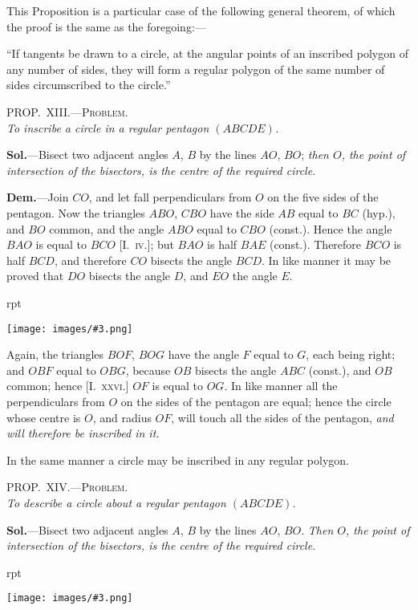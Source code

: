 \documentclass[oneside]{book}
\newcounter{wrapwidth}
\newcommand\myprop[2]{
\bigskip\Needspace*{4\baselineskip}\begin{center}\textsc{#1}\\\medskip\emph{#2}\par\end{center}
}
\newcommand\imgflow[3]{
\setcounter{wrapwidth}{#1}
\begin{wrapfigure}[#2]{r}{\value{wrapwidth}pt}
\begin{center}
\vspace{-0.3in}
\texttt{[image: images/\#3.png]}
\end{center}
\end{wrapfigure}
}
\begin{document}
\begin{footnotesize}
This Proposition is a particular case of the following general
theorem, of which the proof is the same as the foregoing:---

``If tangents be drawn to a circle, at the angular points of an
inscribed polygon of any number of sides, they will form a regular
polygon of the same number of sides circumscribed to the circle.''
\par\end{footnotesize}

\myprop{PROP\@.~XIII\@.---Problem.}{To inscribe a circle in a regular pentagon $(ABCDE)$.}

\textbf{Sol.}---Bisect two adjacent angles $A$, $B$ by the lines
$AO$, $BO$; \textit{then $O$, the point of intersection of the bisectors,
is the centre of the required circle.}

\textbf{Dem.}---Join $CO$, and let fall perpendiculars from $O$
on the five sides of the pentagon.
Now the triangles
$ABO$, $CBO$ have the side $AB$
equal to $BC$ (hyp.), and $BO$
common, and the angle $ABO$
equal to $CBO$ (const.). Hence
the angle $BAO$ is equal to
$BCO$ [I.~\textsc{iv.}]; but $BAO$ is half
$BAE$ (const.). Therefore $BCO$
is half $BCD$, and therefore $CO$
bisects the angle $BCD$. In
like manner it may be proved that $DO$ bisects the
angle $D$, and $EO$ the angle $E$.


\imgflow{133}{11}{f165}

Again, the triangles $BOF$, $BOG$ have the angle $F$
equal to $G$, each being right; and $OBF$ equal to $OBG$,
because $OB$ bisects the angle $ABC$ (const.), and $OB$
common; hence [\textsc{I.~xxvi.}] $OF$ is equal to $OG$. In like
manner all the perpendiculars from $O$ on the sides of
the pentagon are equal; hence the circle whose centre
is $O$, and radius $OF$, will touch all the sides of the
pentagon, \emph{and will therefore be inscribed in it.}

In the same manner a circle may be inscribed in
any regular polygon.

\myprop{PROP\@.~XIV\@.---Problem.}{To describe a circle about a regular pentagon $(ABCDE)$.}

\textbf{Sol.}---Bisect two adjacent angles $A$, $B$ by the lines
$AO$, $BO$. \emph{Then $O$, the point of intersection of the bisectors,
is the centre of the required circle.}

\imgflow{110}{10}{f166}
\end{document}

